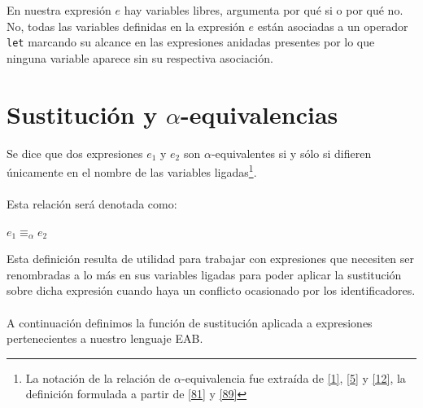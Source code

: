     \begin{exercise}
        En nuestra expresión $e$ hay variables libres, argumenta por qué si o por qué no. \\
    
        No, todas las variables definidas en la expresión $e$ están asociadas a un operador \texttt{let} marcando su alcance en las expresiones anidadas presentes por lo que ninguna variable aparece sin su respectiva asociación.
    \end{exercise}


\section{Sustitución y $\alpha$-equivalencias}
    \begin{definition} Se dice que dos expresiones $e_1$ y $e_2$ son $\alpha$-equivalentes si y sólo si difieren únicamente en el nombre de las variables ligadas\footnote{La notación de la relación de $\alpha$-equivalencia fue extraída de \hyperlink{1}{[1]}, \hyperlink{5}{[5]} y \hyperlink{12}{[12]}, la definición formulada a partir de \hyperlink{81}{[81]} y \hyperlink{89}{[89]}}.\\\\
    Esta relación será denotada como: 
    \begin{center}
            $e_1\equiv_\alpha e_2$        
    \end{center}
    \end{definition}

    Esta definición resulta de utilidad para trabajar con expresiones que necesiten ser renombradas a lo más en sus variables ligadas para poder aplicar la sustitución sobre dicha expresión cuando haya un conflicto ocasionado por los identificadores. \\\\
    A continuación definimos la función de sustitución aplicada a expresiones pertenecientes a nuestro lenguaje \textsf{EAB}.

